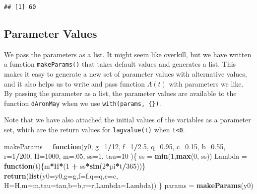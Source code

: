 \documentclass[
]{book}
\newenvironment{Shaded}{\begin{snugshade}}{\end{snugshade}}
\newcommand{\AttributeTok}[1]{\textcolor[rgb]{0.13,0.29,0.53}{#1}}
\newcommand{\ControlFlowTok}[1]{\textcolor[rgb]{0.13,0.29,0.53}{\textbf{#1}}}
\newcommand{\DecValTok}[1]{\textcolor[rgb]{0.00,0.00,0.81}{#1}}
\newcommand{\FloatTok}[1]{\textcolor[rgb]{0.00,0.00,0.81}{#1}}
\newcommand{\FunctionTok}[1]{\textcolor[rgb]{0.13,0.29,0.53}{\textbf{#1}}}
\newcommand{\NormalTok}[1]{#1}
\newcommand{\OtherTok}[1]{\textcolor[rgb]{0.56,0.35,0.01}{#1}}
\newcommand{\SpecialCharTok}[1]{\textcolor[rgb]{0.81,0.36,0.00}{\textbf{#1}}}
\begin{document}
\begin{verbatim}
## [1] 60
\end{verbatim}

\subsection{Parameter Values}\label{parameter-values}

We pass the parameters as a list. It might seem like overkill, but we have written a function \texttt{makeParams()} that takes default values and generates a list. This makes it easy to generate a new set of parameter values with alternative values, and it also helps us to write and pass function \(\Lambda(t)\) with parameters we like. By passing the parameter as a list, the parameter values are available to the function \texttt{dAronMay} when we use \texttt{with(params,\ \{\})}.

Note that we have also attached the initial values of the variables as a parameter set, which are the return values for \texttt{lagvalue(t)} when \texttt{t\textless{}0}.

\begin{Shaded}
\begin{Highlighting}[]
\NormalTok{makeParams }\OtherTok{=} \ControlFlowTok{function}\NormalTok{(y0, }
                      \AttributeTok{g=}\DecValTok{1}\SpecialCharTok{/}\DecValTok{12}\NormalTok{, }\AttributeTok{f=}\DecValTok{1}\SpecialCharTok{/}\FloatTok{2.5}\NormalTok{, }\AttributeTok{q=}\FloatTok{0.95}\NormalTok{,  }
                      \AttributeTok{c=}\FloatTok{0.15}\NormalTok{,}
                      \AttributeTok{b=}\FloatTok{0.55}\NormalTok{, }\AttributeTok{r=}\DecValTok{1}\SpecialCharTok{/}\DecValTok{200}\NormalTok{, }\AttributeTok{H=}\DecValTok{1000}\NormalTok{,  }
                      \AttributeTok{m=}\NormalTok{.}\DecValTok{05}\NormalTok{, }\AttributeTok{ss=}\DecValTok{1}\NormalTok{,  }
                      \AttributeTok{tau=}\DecValTok{10}  
\NormalTok{                      )\{}
\NormalTok{  ss }\OtherTok{=} \FunctionTok{min}\NormalTok{(}\DecValTok{1}\NormalTok{,}\FunctionTok{max}\NormalTok{(}\DecValTok{0}\NormalTok{, ss))}
\NormalTok{  Lambda }\OtherTok{=} \ControlFlowTok{function}\NormalTok{(t)\{m}\SpecialCharTok{*}\NormalTok{H}\SpecialCharTok{*}\NormalTok{(}\DecValTok{1} \SpecialCharTok{+}\NormalTok{ ss}\SpecialCharTok{*}\FunctionTok{sin}\NormalTok{(}\DecValTok{2}\SpecialCharTok{*}\NormalTok{pi}\SpecialCharTok{*}\NormalTok{t}\SpecialCharTok{/}\DecValTok{365}\NormalTok{))\}}
  \FunctionTok{return}\NormalTok{(}\FunctionTok{list}\NormalTok{(}\AttributeTok{y0=}\NormalTok{y0,}\AttributeTok{g=}\NormalTok{g,}\AttributeTok{f=}\NormalTok{f,}\AttributeTok{q=}\NormalTok{q,}\AttributeTok{c=}\NormalTok{c,}
              \AttributeTok{H=}\NormalTok{H,}\AttributeTok{m=}\NormalTok{m,}\AttributeTok{tau=}\NormalTok{tau,}\AttributeTok{b=}\NormalTok{b,}\AttributeTok{r=}\NormalTok{r,}\AttributeTok{Lambda=}\NormalTok{Lambda))}
\NormalTok{\} }
\NormalTok{params }\OtherTok{=} \FunctionTok{makeParams}\NormalTok{(y0)}
\end{Highlighting}
\end{Shaded}
\end{document}
